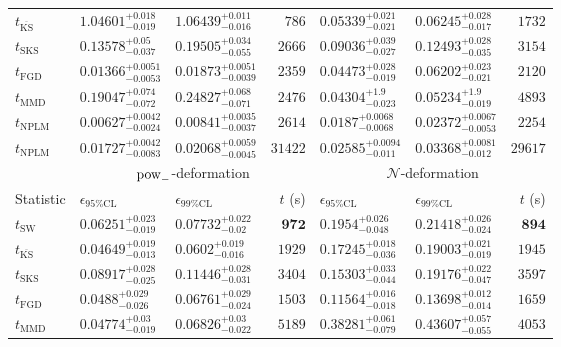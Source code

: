 \begin{tabular}{l|llr|llr}
	$t_{\overline{\mathrm{KS}}}$ & $1.04601_{-0.019}^{+0.018}$ & $1.06439_{-0.016}^{+0.011}$ & $786$ & $0.05339_{-0.021}^{+0.021}$ & $0.06245_{-0.017}^{+0.028}$ & $1732$ \\
	$t_{\mathrm{SKS}}$ & $0.13578_{-0.037}^{+0.05}$ & $0.19505_{-0.055}^{+0.034}$ & $2666$ & $0.09036_{-0.027}^{+0.039}$ & $0.12493_{-0.035}^{+0.028}$ & $3154$ \\
	$t_{\mathrm{FGD}}$ & ${\mathbf{0.01366_{-0.0053}^{+0.0051}}}$ & ${\mathbf{0.01873_{-0.0039}^{+0.0051}}}$ & $2359$ & $0.04473_{-0.019}^{+0.028}$ & $0.06202_{-0.021}^{+0.023}$ & $2120$ \\
	$t_{\mathrm{MMD}}$ & $0.19047_{-0.072}^{+0.074}$ & $0.24827_{-0.071}^{+0.068}$ & $2476$ & ${\mathbf{0.04304_{-0.023}^{+1.9}}}$ & ${\mathbf{0.05234_{-0.019}^{+1.9}}}$ & $4893$ \\
\rowcolor{red!35}	$t_{\mathrm{NPLM}}$ & $0.00627_{-0.0024}^{+0.0042}$ & $0.00841_{-0.0037}^{+0.0035}$ & $2614$ & $0.0187_{-0.0068}^{+0.0068}$ & $0.02372_{-0.0053}^{+0.0067}$ & $2254$ \\
\rowcolor{blue!35}	$t_{\mathrm{NPLM}}$ & $0.01727_{-0.0083}^{+0.0042}$ & $0.02068_{-0.0045}^{+0.0059}$ & $31422$ & $0.02585_{-0.011}^{+0.0094}$ & $0.03368_{-0.012}^{+0.0081}$ & $29617$ \\
	\toprule
	\multicolumn{1}{c}{} & \multicolumn{3}{c}{$\rm{pow}_{-}$-deformation} & \multicolumn{3}{c}{$\mathcal{N}$-deformation} \\
Statistic & $\epsilon_{95\%\mathrm{CL}}$ & $\epsilon_{99\%\mathrm{CL}}$ & $t$ (s) & $\epsilon_{95\%\mathrm{CL}}$ & $\epsilon_{99\%\mathrm{CL}}$ & $t$ (s) \\
	\midrule
	$t_{\mathrm{SW}}$ & $0.06251_{-0.019}^{+0.023}$ & $0.07732_{-0.02}^{+0.022}$ & ${\mathbf{972}}$ & $0.1954_{-0.048}^{+0.026}$ & $0.21418_{-0.024}^{+0.026}$ & ${\mathbf{894}}$ \\
	$t_{\overline{\mathrm{KS}}}$ & ${\mathbf{0.04649_{-0.013}^{+0.019}}}$ & ${\mathbf{0.0602_{-0.016}^{+0.019}}}$ & $1929$ & $0.17245_{-0.036}^{+0.018}$ & $0.19003_{-0.019}^{+0.021}$ & $1945$ \\
	$t_{\mathrm{SKS}}$ & $0.08917_{-0.025}^{+0.028}$ & $0.11446_{-0.031}^{+0.028}$ & $3404$ & $0.15303_{-0.044}^{+0.033}$ & $0.19176_{-0.047}^{+0.022}$ & $3597$ \\
	$t_{\mathrm{FGD}}$ & $0.0488_{-0.026}^{+0.029}$ & $0.06761_{-0.024}^{+0.029}$ & $1503$ & ${\mathbf{0.11564_{-0.018}^{+0.016}}}$ & ${\mathbf{0.13698_{-0.014}^{+0.012}}}$ & $1659$ \\
	$t_{\mathrm{MMD}}$ & $0.04774_{-0.019}^{+0.03}$ & $0.06826_{-0.022}^{+0.03}$ & $5189$ & $0.38281_{-0.079}^{+0.061}$ & $0.43607_{-0.055}^{+0.057}$ & $4053$ \\

\end{tabular}
